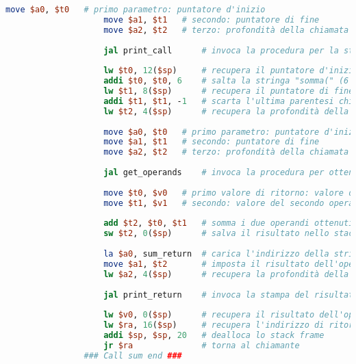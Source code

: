 \begin{center}
\begin{lstlisting}[language=mips, gobble=14, stepnumber=1]
                    move $a0, $t0   # primo parametro: puntatore d'inizio
                    move $a1, $t1   # secondo: puntatore di fine
                    move $a2, $t2   # terzo: profondità della chiamata
                    
                    jal print_call      # invoca la procedura per la stampa dell'invocazione (con gli stessi parametri)
                    
                    lw $t0, 12($sp)     # recupera il puntatore d'inizio dallo stack
                    addi $t0, $t0, 6    # salta la stringa "somma(" (6 caratteri)
                    lw $t1, 8($sp)      # recupera il puntatore di fine
                    addi $t1, $t1, -1   # scarta l'ultima parentesi chiusa
                    lw $t2, 4($sp)      # recupera la profondità della chiamata
                    
                    move $a0, $t0   # primo parametro: puntatore d'inizio
                    move $a1, $t1   # secondo: puntatore di fine
                    move $a2, $t2   # terzo: profondità della chiamata
                    
                    jal get_operands    # invoca la procedura per ottenere gli operandi
                    
                    move $t0, $v0   # primo valore di ritorno: valore del primo operando
                    move $t1, $v1   # secondo: valore del secondo operando
                    
                    add $t2, $t0, $t1   # somma i due operandi ottenuti
                    sw $t2, 0($sp)      # salva il risultato nello stack
                    
                    la $a0, sum_return  # carica l'indirizzo della stringa sum_return (primo parametro)
                    move $a1, $t2       # imposta il risultato dell'operazione come secondo parametro
                    lw $a2, 4($sp)      # recupera la profondità della chiamata (terzo parametro)
                    
                    jal print_return    # invoca la stampa del risultato con questi tre parametri
                    
                    lw $v0, 0($sp)      # recupera il risultato dell'operazione
                    lw $ra, 16($sp)     # recupera l'indirizzo di ritorno
                    addi $sp, $sp, 20   # dealloca lo stack frame
                    jr $ra              # torna al chiamante
                ### Call sum end ###
                

\end{lstlisting}
\end{center}
